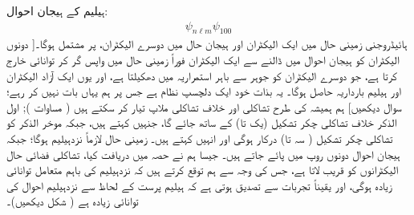  ہیلیم کے ہیجان احوال: 
\begin{align}
 \psi_{n\ell m} \psi_{100}
 \end{align}
ہائیڈروجنی زمینی حال میں ایک الیکٹران اور ہیجان حال میں دوسرے الیکٹران، پر مشتمل ہوگا۔[ دونوں الیکٹران کو ہیجان احوال میں ڈالنے سے ایک الیکٹران فوراً زمینی حال میں واپس گر کر توانائی خارج کرتا ہے، جو دوسرے الیکٹران کو جوہر سے باہر استمراریہ  میں دھکیلتا ہے، اور یوں ایک آزاد الیکٹران اور ہیلیم بارداریہ  حاصل ہوگا۔ یہ بذات خود ایک دلچسپ نظام ہے جس پر ہم یہاں بات نہیں کر رہے؛ سوال  دیکھیں] ہم ہمیشہ کی طرح تشاکلی اور خلاف تشاکلی ملاپ تیار کر سکتے ہیں ( مساوات ); اول الذکر خلاف تشاکلی چکر تشکیل (یک تا) کے ساتھ جائے گا، جنہیں  کہتے ہیں، جبکہ موخر الذکر کو تشاکلی چکر تشکیل ( سہ تا) درکار ہوگی اور انہیں  کہتے ہیں۔ زمینی حال لازماً نزدہیلیم ہوگا؛ جبکہ ہیجان احوال دونوں روپ میں پائے جاتے ہیں۔ جیسا ہم نے حصہ  میں دریافت کیا، تشاکلی فضائی حال الیکٹرانوں کو قریب لاتا ہے، جس کی وجہ سے ہم توقع کرتے ہیں کہ نزدہیلیم کی باہم متعامل توانائی زیادہ ہوگی، اور یقیناً تجربات سے تصدیق ہوتی ہے کہ ہیلیم پرست کے لحاظ سے نزدہیلیم احوال کی توانائی زیادہ ہے ( شکل  دیکھیں)۔

